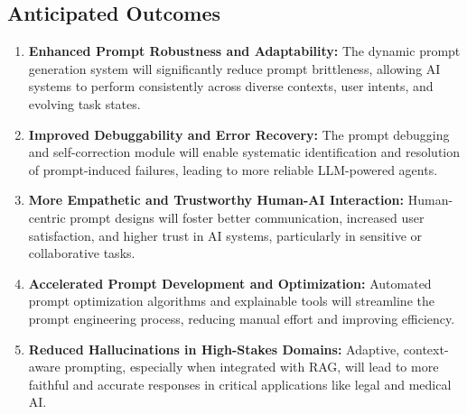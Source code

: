 \documentclass{article}
\begin{document}
\subsection{Anticipated Outcomes}
\begin{enumerate}[label=\arabic*.]
    \item \textbf{Enhanced Prompt Robustness and Adaptability:} The dynamic prompt generation system will significantly reduce prompt brittleness, allowing AI systems to perform consistently across diverse contexts, user intents, and evolving task states.
    \item \textbf{Improved Debuggability and Error Recovery:} The prompt debugging and self-correction module will enable systematic identification and resolution of prompt-induced failures, leading to more reliable LLM-powered agents.
    \item \textbf{More Empathetic and Trustworthy Human-AI Interaction:} Human-centric prompt designs will foster better communication, increased user satisfaction, and higher trust in AI systems, particularly in sensitive or collaborative tasks.
    \item \textbf{Accelerated Prompt Development and Optimization:} Automated prompt optimization algorithms and explainable tools will streamline the prompt engineering process, reducing manual effort and improving efficiency.
    \item \textbf{Reduced Hallucinations in High-Stakes Domains:} Adaptive, context-aware prompting, especially when integrated with RAG, will lead to more faithful and accurate responses in critical applications like legal and medical AI.
\end{enumerate}
\end{document}
